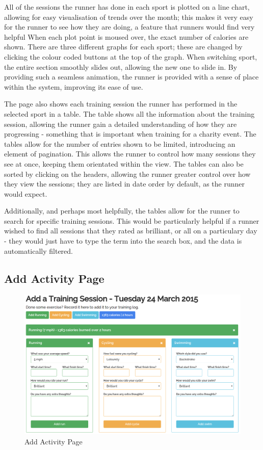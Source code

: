 \documentclass{article}[12pt,a4paper]
\begin{document}
All of the sessions the runner has done in each sport is plotted on a line chart, allowing for easy visualisation of trends over the month; this makes it very easy for the runner to see how they are doing, a feature that runners would find very helpful When each plot point is moused over, the exact number of calories are shown. There are three different graphs for each sport; these are changed by clicking the colour coded buttons at the top of the graph. When switching sport, the entire section smoothly slides out, allowing the new one to slide in. By providing such a seamless animation, the runner is provided with a sense of place within the system, improving its ease of use.

The page also shows each training session the runner has performed in the selected sport in a table. The table shows all the information about the training session, allowing the runner gain a detailed understanding of how they are progressing - something that is important when training for a charity event. The tables allow for the number of entries shown to be limited, introducing an element of pagination. This allows the runner to control how many sessions they see at once, keeping them orientated within the view. The tables can also be sorted by clicking on the headers, allowing the runner greater control over how they view the sessions; they are listed in date order by default, as the runner would expect.

Additionally, and perhaps most helpfully, the tables allow for the runner to search for specific training sessions. This would be particularly helpful if a runner wished to find all sessions that they rated as brilliant, or all on a particulary day - they would just have to type the term into the search box, and the data is automatically filtered.

\clearpage

\subsection{Add Activity Page}

\begin{figure}[h!]
  \includegraphics[scale=0.35]{final_ui/add_activity}
  \caption{Add Activity Page}
\end{figure}
\end{document}
